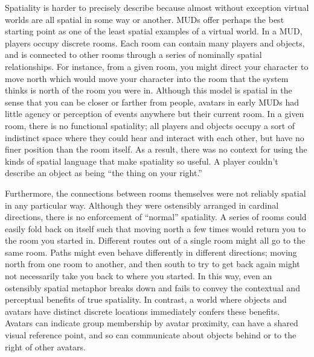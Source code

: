 Spatiality is harder to precisely describe because almost without exception virtual worlds are all spatial in some way or another. MUDs offer perhaps the best starting point as one of the least spatial examples of a virtual world. In a MUD, players occupy discrete rooms. Each room can contain many players and objects, and is connected to other rooms through a series of nominally spatial relationships. For instance, from a given room, you might direct your character to move north which would move your character into the room that the system thinks is north of the room you were in. Although this model is spatial in the sense that you can be closer or farther from people, avatars in early MUDs had little agency or perception of events anywhere but their current room. In a given room, there is no functional spatiality; all players and objects occupy a sort of indistinct space where they could hear and interact with each other, but have no finer position than the room itself. As a result, there was no context for using the kinds of spatial language that make spatiality so useful. A player couldn't describe an object as being ``the thing on your right.''

Furthermore, the connections between rooms themselves were not reliably spatial in any particular way. Although they were ostensibly arranged in cardinal directions, there is no enforcement of “normal” spatiality. A series of rooms could easily fold back on itself such that moving north a few times would return you to the room you started in. Different routes out of a single room might all go to the same room. Paths might even behave differently in different directions; moving north from one room to another, and then south to try to get back again might not necessarily take you back to where you started. In this way, even an ostensibly spatial metaphor breaks down and fails to convey the contextual and perceptual benefits of true spatiality. In contrast, a world where objects and avatars have distinct discrete locations immediately confers these benefits. Avatars can indicate group membership by avatar proximity, can have a shared visual reference point, and so can communicate about objects behind or to the right of other avatars. 

